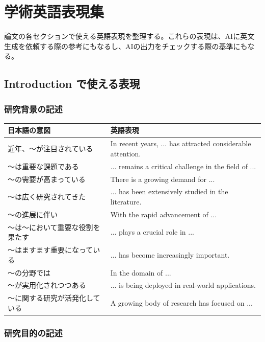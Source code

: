 \chapter{学術英語表現集}
\label{app:english}

論文の各セクションで使える英語表現を整理する。これらの表現は、AIに英文生成を依頼する際の参考にもなるし、AIの出力をチェックする際の基準にもなる。

\section{Introduction で使える表現}

\subsection*{研究背景の記述}

\begin{table}[H]
\centering
\small
\begin{tabular}{p{4cm}p{6cm}}
\toprule
日本語の意図 & 英語表現 \\
\midrule
近年、〜が注目されている & In recent years, ... has attracted considerable attention. \\
〜は重要な課題である & ... remains a critical challenge in the field of ... \\
〜の需要が高まっている & There is a growing demand for ... \\
〜は広く研究されてきた & ... has been extensively studied in the literature. \\
〜の進展に伴い & With the rapid advancement of ... \\
〜は〜において重要な役割を果たす & ... plays a crucial role in ... \\
〜はますます重要になっている & ... has become increasingly important. \\
〜の分野では & In the domain of ... \\
〜が実用化されつつある & ... is being deployed in real-world applications. \\
〜に関する研究が活発化している & A growing body of research has focused on ... \\
\bottomrule
\end{tabular}
\end{table}

\subsection*{研究目的の記述}


